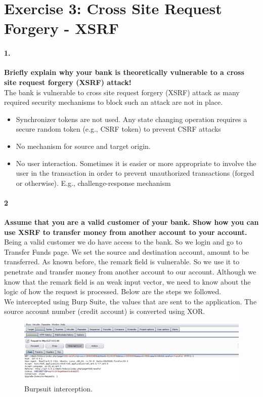 \documentclass[12pt]{report}
\begin{document}
	\section*{Exercise 3: Cross Site Request Forgery - XSRF}
	\paragraph*{1.}{\bf Briefly explain why your bank is theoretically vulnerable to a cross site request forgery (XSRF) attack!}\\
	
	The bank is vulnerable to  cross site request forgery (XSRF) attack as many required security mechanisms to block such an attack are not in place. 
	\begin{itemize}
		\item Synchronizer tokens are not used. Any state changing operation requires a secure random token (e.g., CSRF token) to prevent CSRF attacks
		\item No mechanism for source and target origin.
		\item No user interaction. Sometimes it is easier or more appropriate to involve the user in the transaction in order to prevent unauthorized transactions (forged or otherwise). E.g., challenge-response mechanism
	\end{itemize}
	
	\paragraph*{2}{\bf Assume that you are a valid customer of your bank. Show how you can use XSRF to transfer money from another account to your account. }\\
	
	Being a valid customer we do have access to the bank. So we login and go to Transfer Funds page. We set the source and destination account, amount to be transferred. As known before, the remark field is vulnerable. So we use it to penetrate and transfer money from another account to our account.  Although we know that the remark field is an weak input vector, we need to know about the logic  of how the request is processed. Below are the steps we followed.\\
	
	We intercepted using Burp Suite, the values that are sent to the application. The source account number (credit account) is converted using XOR.
	\begin{figure}[H]
		\includegraphics[width=0.70\textheight]{images/3_2burp.jpg}
		\caption{Burpsuit interception.}
		
	\end{figure}
	
\end{document}

